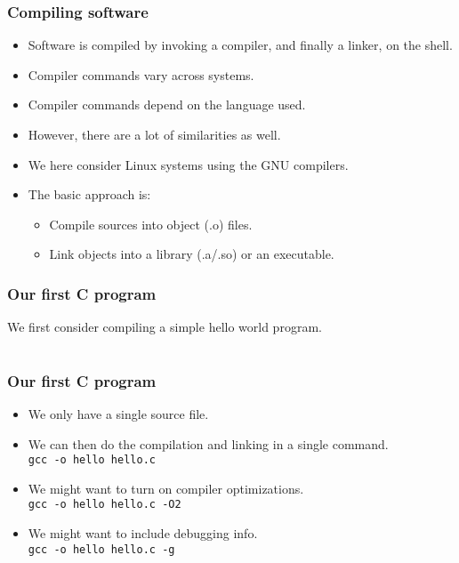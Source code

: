 \begin{frame}
  \frametitle{Compiling software}
  \begin{itemize}
  \item Software is compiled by invoking a compiler, and finally a linker, on the shell.
  \item Compiler commands vary across systems.
  \item Compiler commands depend on the language used.
  \item However, there are a lot of similarities as well.
  \item We here consider Linux systems using the GNU compilers.
  \item The basic approach is:
    \begin{itemize}
    \item Compile sources into object (.o) files.
    \item Link objects into a library (.a/.so) or an executable.
    \end{itemize}
  \end{itemize}
\end{frame}

\begin{frame}[fragile]
  \frametitle{Our first C program}
  We first consider compiling a simple hello world program.
  \begin{center}
    \begin{tabular}{c}
      
    \end{tabular}
  \end{center}
\end{frame}

\begin{frame}
  \frametitle{Our first C program}
  \begin{itemize}
  \item We only have a single source file.
  \item We can then do the compilation and linking in a single command. \\
    \texttt{gcc -o hello hello.c}
  \item We might want to turn on compiler optimizations. \\
    \texttt{gcc -o hello hello.c -O2}
  \item We might want to include debugging info. \\
    \texttt{gcc -o hello hello.c -g}
  \end{itemize}
\end{frame}

